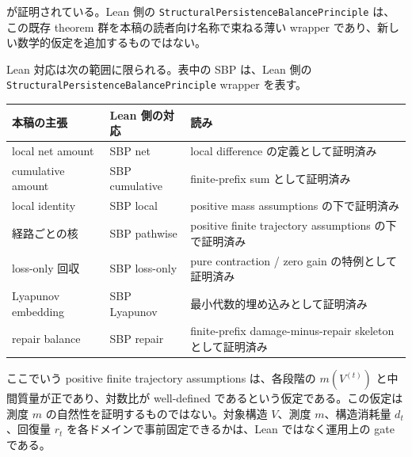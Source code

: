 \documentclass[12pt,a4paper]{article}
\begin{document}
が証明されている。Lean 側の \texttt{StructuralPersistenceBalancePrinciple} は、この既存 theorem 群を本稿の読者向け名称で束ねる薄い wrapper であり、新しい数学的仮定を追加するものではない。

Lean 対応は次の範囲に限られる。表中の SBP は、Lean 側の \texttt{StructuralPersistenceBalancePrinciple} wrapper を表す。

{\def\LTcaptype{table} %
\begin{longtable}[]{@{}
  >{\raggedright\arraybackslash}p{}
  >{\raggedright\arraybackslash}p{}
  >{\raggedright\arraybackslash}p{}@{}}
\toprule\noalign{}
\begin{minipage}[b]{\linewidth}\raggedright
本稿の主張
\end{minipage} & \begin{minipage}[b]{\linewidth}\raggedright
Lean 側の対応
\end{minipage} & \begin{minipage}[b]{\linewidth}\raggedright
読み
\end{minipage} \\
\midrule\noalign{}
\endhead
\bottomrule\noalign{}
\endlastfoot
local net amount & SBP net & local difference の定義として証明済み \\
cumulative amount & SBP cumulative & finite-prefix sum として証明済み \\
local identity & SBP local & positive mass assumptions の下で証明済み \\
経路ごとの核 & SBP pathwise & positive finite trajectory assumptions の下で証明済み \\
loss-only 回収 & SBP loss-only & pure contraction / zero gain の特例として証明済み \\
Lyapunov embedding & SBP Lyapunov & 最小代数的埋め込みとして証明済み \\
repair balance & SBP repair & finite-prefix damage-minus-repair skeleton として証明済み \\
\end{longtable}
}

ここでいう positive finite trajectory assumptions は、各段階の \(m(V^{(t)})\) と中間質量が正であり、対数比が well-defined であるという仮定である。この仮定は測度 \(m\) の自然性を証明するものではない。対象構造 \(V\)、測度 \(m\)、構造消耗量 \(d_{t}\)、回復量 \(r_{t}\) を各ドメインで事前固定できるかは、Lean ではなく運用上の gate である。
\end{document}
